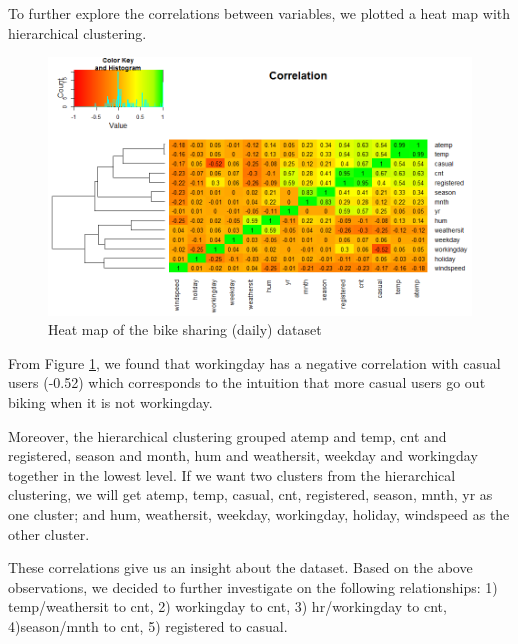 \documentclass[12pt]{article}
\begin{document}
    To further explore the correlations between variables, we plotted a heat map with hierarchical clustering. 
	\begin{figure}[H]
		\includegraphics[scale=0.6]{figures/correlation.png}
		\caption{Heat map of the bike sharing (daily) dataset}
		\label{fig:correlation}
	\end{figure}
	From Figure \ref{fig:correlation}, we found that workingday has a negative correlation with casual users (-0.52) which corresponds to the intuition that more casual users go out biking when it is not workingday. 
	
	Moreover, the hierarchical clustering grouped atemp and temp, cnt and registered, season and month, hum and weathersit, weekday and workingday together in the lowest level.  If we want two clusters from the hierarchical clustering, we will get atemp, temp, casual, cnt, registered, season, mnth, yr as one cluster; and hum, weathersit, weekday, workingday, holiday, windspeed as the other cluster.
	
	These correlations give us an insight about the dataset. 	Based on the above observations, we decided to further investigate on the following relationships: 1) temp/weathersit to cnt, 2) workingday to cnt, 3) hr/workingday to cnt, 4)season/mnth to cnt, 5) registered to casual. 
	
	
\end{document}
